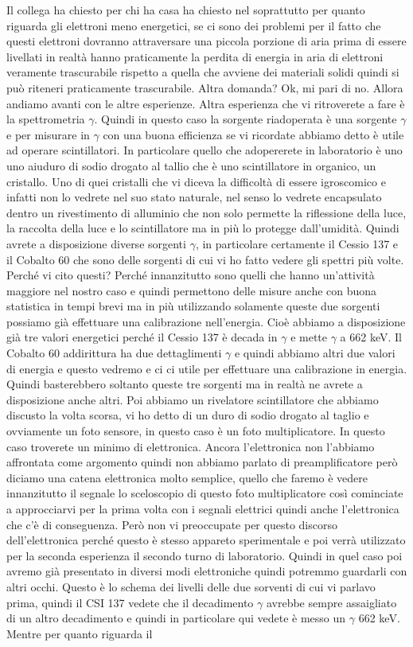 Il collega ha chiesto per chi ha casa ha chiesto nel soprattutto per quanto riguarda gli elettroni meno energetici, se ci sono dei problemi per il fatto che questi elettroni dovranno attraversare una piccola porzione di aria prima di essere livellati in realtà hanno praticamente la perdita di energia in aria di elettroni veramente trascurabile rispetto a quella che avviene dei materiali solidi quindi si può riteneri praticamente trascurabile. Altra domanda? Ok, mi pari di no. Allora andiamo avanti con le altre esperienze. Altra esperienza che vi ritroverete a fare è la spettrometria $\gamma$. Quindi in questo caso la sorgente riadoperata è una sorgente $\gamma$ e per misurare in $\gamma$ con una buona efficienza se vi ricordate abbiamo detto è utile ad operare scintillatori. In particolare quello che adopererete in laboratorio è uno uno aiuduro di sodio drogato al tallio che è uno scintillatore in organico, un cristallo. Uno di quei cristalli che vi diceva la difficoltà di essere igroscomico e infatti non lo vedrete nel suo stato naturale, nel senso lo vedrete encapsulato dentro un rivestimento di alluminio che non solo permette la riflessione della luce, la raccolta della luce e lo scintillatore ma in più lo protegge dall'umidità. Quindi avrete a disposizione diverse sorgenti $\gamma$, in particolare certamente il Cessio 137 e il Cobalto 60 che sono delle sorgenti di cui vi ho fatto vedere gli spettri più volte. Perché vi cito questi? Perché innanzitutto sono quelli che hanno un'attività maggiore nel nostro caso e quindi permettono delle misure anche con buona statistica in tempi brevi ma in più utilizzando solamente queste due sorgenti possiamo già effettuare una calibrazione nell'energia. Cioè abbiamo a disposizione già tre valori energetici perché il Cessio 137 è decada in $\gamma$ e mette $\gamma$ a 662 keV. Il Cobalto 60 addirittura ha due dettaglimenti $\gamma$ e quindi abbiamo altri due valori di energia e questo vedremo e ci ci utile per effettuare una calibrazione in energia. Quindi basterebbero soltanto queste tre sorgenti ma in realtà ne avrete a disposizione anche altri. Poi abbiamo un rivelatore scintillatore che abbiamo discusto la volta scorsa, vi ho detto di un duro di sodio drogato al taglio e ovviamente un foto sensore, in questo caso è un foto multiplicatore. In questo caso troverete un minimo di elettronica. Ancora l'elettronica non l'abbiamo affrontata come argomento quindi non abbiamo parlato di preamplificatore però diciamo una catena elettronica molto semplice, quello che faremo è vedere innanzitutto il segnale lo sceloscopio di questo foto multiplicatore così cominciate a approcciarvi per la prima volta con i segnali elettrici quindi anche l'elettronica che c'è di conseguenza. Però non vi preoccupate per questo discorso dell'elettronica perché questo è stesso appareto sperimentale e poi verrà utilizzato per la seconda esperienza il secondo turno di laboratorio. Quindi in quel caso poi avremo già presentato in diversi modi elettroniche quindi potremmo guardarli con altri occhi. Questo è lo schema dei livelli delle due sorventi di cui vi parlavo prima, quindi il CSI 137 vedete che il decadimento $\gamma$ avrebbe sempre assaigliato di un altro decadimento e quindi in particolare qui vedete è messo un $\gamma$ 662 keV. Mentre per quanto riguarda il 